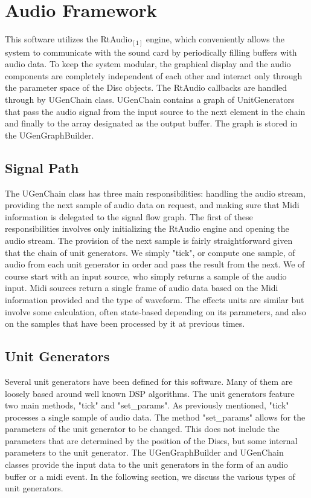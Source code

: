 \documentclass[pdftext,twoside,10pt]{article}
\begin{document}
\section{Audio Framework}

This software utilizes the RtAudio$_{[1]}$ engine, which conveniently allows the system to communicate with the sound card by periodically filling buffers with audio data. To keep the system modular, the graphical display and the audio components are completely independent of each other and interact only through the parameter space of the Disc objects. The RtAudio callbacks are handled through by UGenChain class. UGenChain contains a graph of UnitGenerators that pass the audio signal from the input source to the next element in the chain and finally to the array designated as the output buffer. The graph is stored in the UGenGraphBuilder.

\subsection{Signal Path}
The UGenChain class has three main responsibilities: handling the audio stream, providing the next sample of audio data on request, and making sure that Midi information is delegated to the signal flow graph. The first of these responsibilities involves only initializing the RtAudio engine and opening the audio stream. The provision of the next sample is fairly straightforward given that the chain of unit generators. We simply "tick", or compute one sample, of audio from each unit generator in order and pass the result from the next. We of course start with an input source, who simply returns a sample of the audio input. Midi sources return a single frame of audio data based on the Midi information provided and the type of waveform. The effects units are similar but involve some calculation, often state-based depending on its parameters, and also on the samples that have been processed by it at previous times.\\

\subsection{Unit Generators}
Several unit generators have been defined for this software. Many of them are loosely based around well known DSP algorithms. The unit generators feature two main methods, "tick" and "set\_params". As previously mentioned, "tick" processes a single sample of audio data. The method "set\_params" allows for the parameters of the unit generator to be changed. This does not include the parameters that are determined by the position of the Discs, but some internal parameters to the unit generator. The UGenGraphBuilder and UGenChain classes provide the input data to the unit generators in the form of an audio buffer or a midi event. In the following section, we discuss the various types of unit generators.
\end{document}
